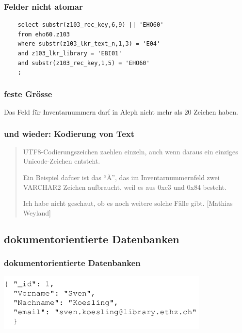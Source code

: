 \begin{frame}[fragile]
\frametitle{Felder nicht atomar}
  \begin{lstlisting}
    select substr(z103_rec_key,6,9) || 'EHO60'
    from eho60.z103
    where substr(z103_lkr_text_n,1,3) = 'E04'
    and z103_lkr_library = 'EBI01'
    and substr(z103_rec_key,1,5) = 'EHO60'
    ;
  \end{lstlisting}
\end{frame}
        

      \begin{frame}
        \frametitle{feste Grösse}
        Das Feld für Inventarnummern darf in Aleph nicht mehr als 20 Zeichen haben. 
      \end{frame}

      \begin{frame}
      \frametitle{und wieder: Kodierung von Text}
        \begin{quote}
          UTF8-Codierungszeichen zaehlen einzeln, auch wenn daraus ein einziges Unicode-Zeichen entsteht. 

          Ein Beispiel dafuer ist das ``Ä'', das im Inventarnummernfeld zwei VARCHAR2 Zeichen aufbraucht, weil es aus 0xc3 und 0x84 besteht. 

          Ich habe nicht geschaut, ob es noch weitere solche Fälle gibt. \hfill{[Mathias Weyland]}
        \end{quote}
      \end{frame}

    \subsection{dokumentorientierte Datenbanken}
      \begin{frame}
        \frametitle<beamer>{dokumentorientierte Datenbanken}
        \begin{center}
          \includegraphics[width=0.8\textwidth]{pics/doc1}
        \end{center}
      \end{frame}

